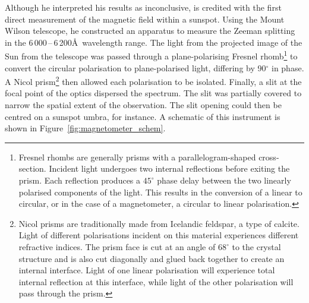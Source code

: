 Although he interpreted his results as inconclusive, \cite{Hale:1908} is credited with the first direct measurement of the magnetic field within a sunspot. Using the Mount Wilson telescope, he constructed an apparatus to measure the Zeeman splitting in the 6\,000\,--\,6\,200\AA\ wavelength range. The light from the projected image of the Sun from the telescope was passed through a plane-polarising Fresnel rhomb\footnote{Fresnel rhombs are generally prisms with a parallelogram-shaped cross-section. Incident light undergoes two internal reflections before exiting the prism. Each reflection produces a $45^{\circ}$ phase delay between the two linearly polarised components of the light. This results in the conversion of a linear to circular, or in the case of a magnetometer, a circular to linear polarisation.} to convert the circular polarisation to plane-polarised light, differing by 90$^{\circ}$ in phase. A Nicol prism\footnote{Nicol prisms are traditionally made from Icelandic feldspar, a type of calcite. Light of different polarisations incident on this material experiences different refractive indices. The prism face is cut at an angle of $68^\circ$ to the crystal structure and is also cut diagonally and glued back together to create an internal interface. Light of one linear polarisation will experience total internal reflection at this interface, while light of the other polarisation will pass through the prism.} then allowed each polarisation to be isolated. Finally, a slit at the focal point of the optics dispersed the spectrum. The slit was partially covered to narrow the spatial extent of the observation. The slit opening could then be centred on a sunspot umbra, for instance. A schematic of this instrument is shown in Figure~\ref{fig:magnetometer_schem}. %


